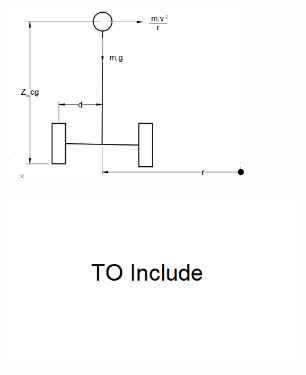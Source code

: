 \begin{figure}
 	\centering
 	\begin{minipage}{.5\textwidth}
 		\centering
 		\includegraphics[width=.9\linewidth,height=4.5cm,keepaspectratio]{Chapter3/fig/LateralOverturn}
 		\label{fig:LatOverturn}
 	\end{minipage}%
 	\begin{minipage}{.5\textwidth}
 		\centering
 		\includegraphics[height=4.5cm,keepaspectratio]{Chapter3/fig/xxx}
 		\label{fig:xxx}
 	\end{minipage}
 \end{figure}

